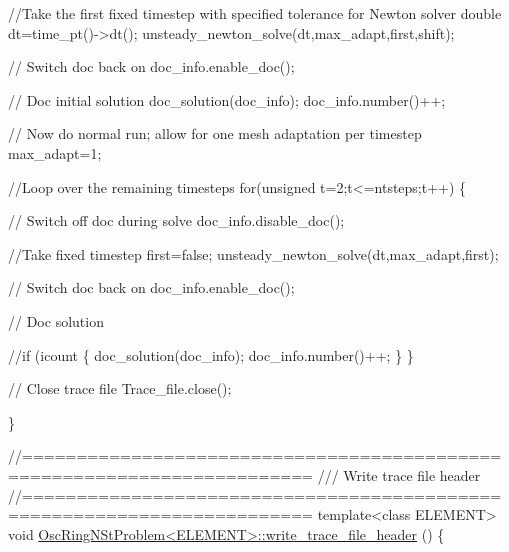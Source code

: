 \begin{DoxyCodeInclude}
{{{{{{ \textcolor{comment}{//Take the first fixed timestep with specified tolerance for Newton solver}
 \textcolor{keywordtype}{double} dt=time\_pt()->dt();
 unsteady\_newton\_solve(dt,max\_adapt,first,shift);

 \textcolor{comment}{// Switch doc back on}
 doc\_info.enable\_doc();

 \textcolor{comment}{// Doc initial solution}
 doc\_solution(doc\_info);
 doc\_info.number()++;

 \textcolor{comment}{// Now do normal run; allow for one mesh adaptation per timestep}
 max\_adapt=1;

 \textcolor{comment}{//Loop over the remaining timesteps}
 \textcolor{keywordflow}{for}(\textcolor{keywordtype}{unsigned} t=2;t<=ntsteps;t++)
  \{

   \textcolor{comment}{// Switch off doc during solve}
   doc\_info.disable\_doc();

   \textcolor{comment}{//Take fixed timestep}
   first=\textcolor{keyword}{false};
   unsteady\_newton\_solve(dt,max\_adapt,first);

   \textcolor{comment}{// Switch doc back on}
   doc\_info.enable\_doc();

   \textcolor{comment}{// Doc solution}
   \textcolor{comment}{//if (icount%
    \{
     doc\_solution(doc\_info);
     doc\_info.number()++;
    \}
  \}

 \textcolor{comment}{// Close trace file}
 Trace\_file.close();

\}




\textcolor{comment}{//========================================================================}\textcolor{comment}{}
\textcolor{comment}{/// Write trace file header}
\textcolor{comment}{}\textcolor{comment}{//========================================================================}
\textcolor{keyword}{template}<\textcolor{keyword}{class} ELEMENT>
\textcolor{keywordtype}{void} \hyperlink{classOscRingNStProblem_a96e12e5bb761d765ebe9065b9990112f}{OscRingNStProblem<ELEMENT>::write\_trace\_file\_header}
      ()
\{

}}}}}}}
\end{DoxyCodeInclude}
